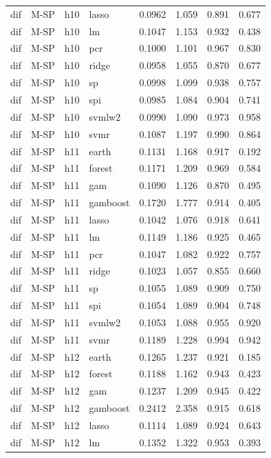 \begin{ThreePartTable}
\begin{longtable}[t]{llclcccc}
dif & M-SP & h10 & lasso & 0.0962 & 1.059 & 0.891 & 0.677\\
dif & M-SP & h10 & lm & 0.1047 & 1.153 & 0.932 & 0.438\\
dif & M-SP & h10 & pcr & 0.1000 & 1.101 & 0.967 & 0.830\\
dif & M-SP & h10 & ridge & 0.0958 & 1.055 & 0.870 & 0.677\\
dif & M-SP & h10 & sp & 0.0998 & 1.099 & 0.938 & 0.757\\
dif & M-SP & h10 & spi & 0.0985 & 1.084 & 0.904 & 0.741\\
dif & M-SP & h10 & svmlw2 & 0.0990 & 1.090 & 0.973 & 0.958\\
dif & M-SP & h10 & svmr & 0.1087 & 1.197 & 0.990 & 0.864\\
\addlinespace
dif & M-SP & h11 & earth & 0.1131 & 1.168 & 0.917 & 0.192\\
dif & M-SP & h11 & forest & 0.1171 & 1.209 & 0.969 & 0.584\\
dif & M-SP & h11 & gam & 0.1090 & 1.126 & 0.870 & 0.495\\
dif & M-SP & h11 & gamboost & 0.1720 & 1.777 & 0.914 & 0.405\\
dif & M-SP & h11 & lasso & 0.1042 & 1.076 & 0.918 & 0.641\\
dif & M-SP & h11 & lm & 0.1149 & 1.186 & 0.925 & 0.465\\
dif & M-SP & h11 & pcr & 0.1047 & 1.082 & 0.922 & 0.757\\
dif & M-SP & h11 & ridge & 0.1023 & 1.057 & 0.855 & 0.660\\
dif & M-SP & h11 & sp & 0.1055 & 1.089 & 0.909 & 0.750\\
dif & M-SP & h11 & spi & 0.1054 & 1.089 & 0.904 & 0.748\\
dif & M-SP & h11 & svmlw2 & 0.1053 & 1.088 & 0.955 & 0.920\\
dif & M-SP & h11 & svmr & 0.1189 & 1.228 & 0.994 & 0.942\\
\addlinespace
dif & M-SP & h12 & earth & 0.1265 & 1.237 & 0.921 & 0.185\\
dif & M-SP & h12 & forest & 0.1188 & 1.162 & 0.943 & 0.423\\
dif & M-SP & h12 & gam & 0.1237 & 1.209 & 0.945 & 0.422\\
dif & M-SP & h12 & gamboost & 0.2412 & 2.358 & 0.915 & 0.618\\
dif & M-SP & h12 & lasso & 0.1114 & 1.089 & 0.924 & 0.643\\
dif & M-SP & h12 & lm & 0.1352 & 1.322 & 0.953 & 0.393\\

\end{longtable}
\end{ThreePartTable}
